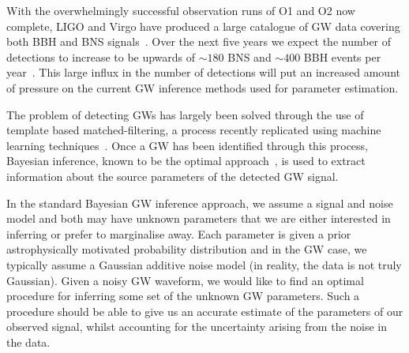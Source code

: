 %
%
%
With the overwhelmingly successful observation runs of O1 and O2 now complete,
\ac{LIGO} and Virgo have produced a large catalogue of \ac{GW} data covering
both \ac{BBH} and \ac{BNS} signals~\cite{1811.12907}. Over the next five years
we expect the number of detections to increase to be upwards of $\sim180$
\ac{BNS} and $\sim400$ BBH events per year~\cite{1304.0670,1811.12907}. This
large influx in the number of detections will put an increased amount of
pressure on the current \ac{GW} inference methods used for parameter
estimation.  

%
%

The problem of detecting \acp{GW} has largely been solved through the use of
template based matched-filtering, a process recently replicated using machine
learning techniques~\cite{GEORGE201864,PhysRevLett.120.141103,GebKilParHarSch}.
Once a \ac{GW} has been identified through this process, Bayesian inference,
known to be the optimal approach~\cite{2009CQGra..26o5017S}, is used to extract
information about the source parameters of the detected \ac{GW} signal.

%
%
In the standard Bayesian \ac{GW} inference approach, we assume a signal and
noise model and both may have unknown parameters that we are either interested
in inferring or prefer to marginalise away. Each parameter is given a prior
astrophysically motivated probability distribution and in the \ac{GW} case, we
typically assume a Gaussian additive noise model (in reality, the data is not
truly Gaussian). Given a noisy \ac{GW} waveform, we would like to find an
optimal procedure for inferring some set of the unknown \ac{GW} parameters.
Such a procedure should be able to give us an accurate estimate of the
parameters of our observed signal, whilst accounting for the uncertainty
arising from the noise in the data.

